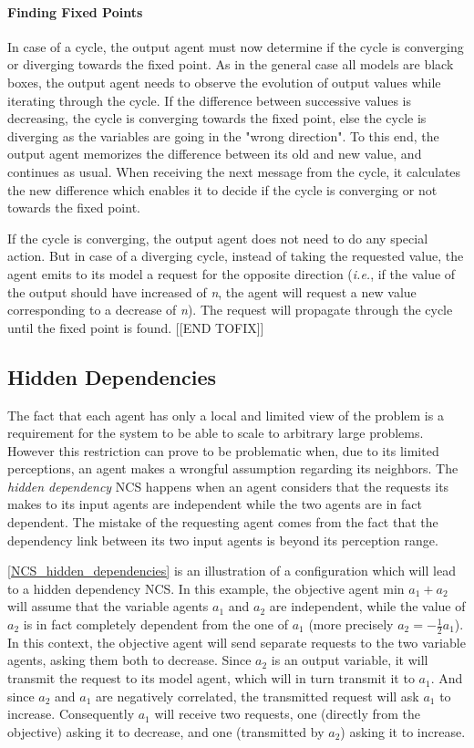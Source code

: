 \paragraph*{Finding Fixed Points}
In case of a cycle, the output agent must now determine if the cycle is converging or diverging towards the fixed point. As in the general case all models are black boxes, the output agent needs to observe the evolution of output values while iterating through the cycle. If the difference between successive values is decreasing, the cycle is converging towards the fixed point, else the cycle is diverging as the variables are going in the "wrong direction". To this end, the output agent memorizes the difference between its old and new value, and continues as usual. When receiving the next message from the cycle, it calculates the new difference which enables it to decide if the cycle is converging or not towards the fixed point.

If the cycle is converging, the output agent does not need to do any special action. But in case of a diverging cycle, instead of taking the requested value, the agent emits to its model a request for the opposite direction (\emph{i.e.}, if the value of the output should have increased of \emph{n}, the agent will request a new value corresponding to a decrease of \emph{n}). The request will propagate through the cycle until the fixed point is found.
[[END TOFIX]]

\subsection{Hidden Dependencies}\label{hidden_deps}

The fact that each agent has only a local and limited view of the problem is a requirement for the system to be able to scale to arbitrary large problems. However this restriction can prove to be problematic when, due to its limited perceptions, an agent makes a wrongful assumption regarding its neighbors. The \emph{hidden dependency} NCS happens when an agent considers that the requests its makes to its input agents are independent while the two agents are in fact dependent. The mistake of the requesting agent comes from the fact that the dependency link between its two input agents is beyond its perception range.

\figurename{} \ref{NCS_hidden_dependencies} is an illustration of a configuration which will lead to a hidden dependency NCS. In this example, the objective agent $\text{min }a_1 + a_2$ will assume that the variable agents $a_1$ and $a_2$ are independent, while the value of $a_2$ is in fact completely dependent from the one of $a_1$ (more precisely $a_2 = -\frac{1}{2} a_1$). In this context, the objective agent will send separate requests to the two variable agents, asking them both to decrease. Since $a_2$ is an output variable, it will transmit the request to its model agent, which will in turn transmit it to $a_1$. And since $a_2$ and $a_1$ are negatively correlated, the transmitted request will ask $a_1$ to increase. Consequently $a_1$ will receive two requests, one (directly from the objective) asking it to decrease, and one (transmitted by $a_2$) asking it to increase.


